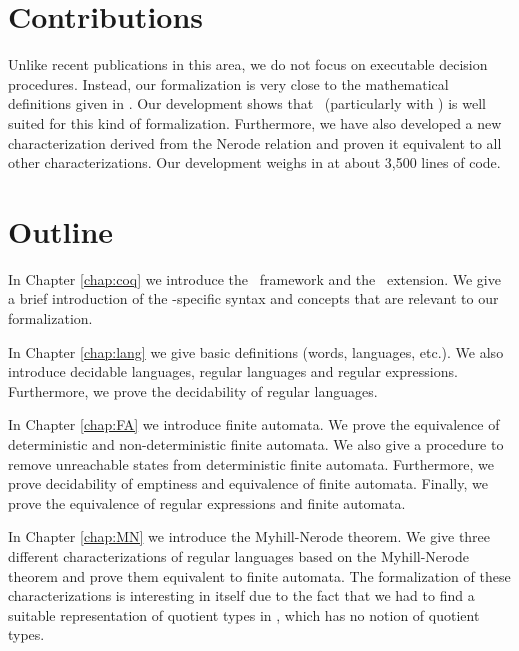 \section{Contributions}
Unlike recent publications in this area, we do not focus on executable decision procedures.
    Instead, our formalization is very close to the mathematical definitions given in \cite{DBLP:books/daglib/0088160}.
Our development shows that \coq\ (particularly with \ssreflect) is well suited for this kind of formalization.
Furthermore, we have also developed a new characterization derived from the Nerode relation and proven it equivalent to all other characterizations.
Our development weighs in at about 3,500 lines of code.


\section{Outline}
In Chapter \ref{chap:coq} we introduce the \coq\ framework and the \ssreflect\ extension. 
We give a brief introduction of the \ssreflect-specific syntax and concepts that are relevant to our formalization.

In Chapter \ref{chap:lang} we give basic definitions (words, languages, etc.). 
We also introduce decidable languages, regular languages and regular expressions. 
Furthermore, we prove the decidability of regular languages.

In Chapter \ref{chap:FA} we introduce finite automata.
We prove the equivalence of deterministic and non-deterministic finite automata.
We also give a procedure to remove unreachable states from deterministic finite automata.
Furthermore, we prove decidability of emptiness and equivalence of finite automata.
Finally, we prove the equivalence of regular expressions and finite automata. 

In Chapter \ref{chap:MN} we introduce the Myhill-Nerode theorem.
We give three different characterizations of regular languages based on the Myhill-Nerode theorem and prove them equivalent to finite automata.
The formalization of these characterizations is interesting in itself due to the fact that we had to find a suitable representation of quotient types in \coq, which has no notion of quotient types.
